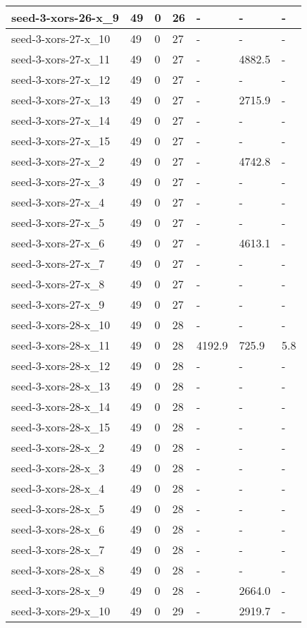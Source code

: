 \begin{scriptsize}
\begin{longtable}{|p{5cm}|l|l|l|l|l|l|}
seed-3-xors-26-x\_9&49&0&26&-&-&- \\ \hline 
seed-3-xors-27-x\_10&49&0&27&-&-&- \\ \hline 
seed-3-xors-27-x\_11&49&0&27&-&4882.5&- \\ \hline 
seed-3-xors-27-x\_12&49&0&27&-&-&- \\ \hline 
seed-3-xors-27-x\_13&49&0&27&-&2715.9&- \\ \hline 
seed-3-xors-27-x\_14&49&0&27&-&-&- \\ \hline 
seed-3-xors-27-x\_15&49&0&27&-&-&- \\ \hline 
seed-3-xors-27-x\_2&49&0&27&-&4742.8&- \\ \hline 
seed-3-xors-27-x\_3&49&0&27&-&-&- \\ \hline 
seed-3-xors-27-x\_4&49&0&27&-&-&- \\ \hline 
seed-3-xors-27-x\_5&49&0&27&-&-&- \\ \hline 
seed-3-xors-27-x\_6&49&0&27&-&4613.1&- \\ \hline 
seed-3-xors-27-x\_7&49&0&27&-&-&- \\ \hline 
seed-3-xors-27-x\_8&49&0&27&-&-&- \\ \hline 
seed-3-xors-27-x\_9&49&0&27&-&-&- \\ \hline 
seed-3-xors-28-x\_10&49&0&28&-&-&- \\ \hline 
seed-3-xors-28-x\_11&49&0&28&4192.9&725.9&5.8 \\ \hline 
seed-3-xors-28-x\_12&49&0&28&-&-&- \\ \hline 
seed-3-xors-28-x\_13&49&0&28&-&-&- \\ \hline 
seed-3-xors-28-x\_14&49&0&28&-&-&- \\ \hline 
seed-3-xors-28-x\_15&49&0&28&-&-&- \\ \hline 
seed-3-xors-28-x\_2&49&0&28&-&-&- \\ \hline 
seed-3-xors-28-x\_3&49&0&28&-&-&- \\ \hline 
seed-3-xors-28-x\_4&49&0&28&-&-&- \\ \hline 
seed-3-xors-28-x\_5&49&0&28&-&-&- \\ \hline 
seed-3-xors-28-x\_6&49&0&28&-&-&- \\ \hline 
seed-3-xors-28-x\_7&49&0&28&-&-&- \\ \hline 
seed-3-xors-28-x\_8&49&0&28&-&-&- \\ \hline 
seed-3-xors-28-x\_9&49&0&28&-&2664.0&- \\ \hline 
seed-3-xors-29-x\_10&49&0&29&-&2919.7&- \\ \hline 

\end{longtable}
\end{scriptsize}
